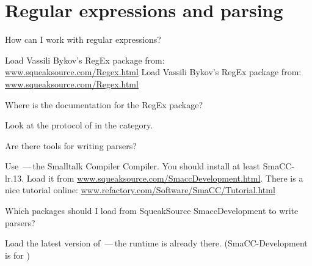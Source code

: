 \documentclass[a4paper,10pt,twoside]{book}
\begin{document}
\section{Regular expressions and parsing}

\begin{faq}
How can I work with regular expressions?
\end{faq}
\answer
\ifluluelse
	{Load Vassili Bykov's RegEx package from: \\
	\url{www.squeaksource.com/Regex.html}}
	{Load Vassili Bykov's RegEx package from:
	\url{www.squeaksource.com/Regex.html}}

\begin{faq}
Where is the documentation for the RegEx package?
\end{faq}
\answer
Look at the  protocol of  in the  category.

\begin{faq}
Are there tools for writing parsers?
\end{faq}
\answer
Use \,---\,the Smalltalk Compiler Compiler.
You should install at least SmaCC-lr.13.
Load it from \url{www.squeaksource.com/SmaccDevelopment.html}.
There is a nice tutorial online:
\url{www.refactory.com/Software/SmaCC/Tutorial.html}

\begin{faq}
Which packages should I load from SqueakSource SmaccDevelopment to write parsers?
\end{faq}
\answer
Load the latest version of \,---\,the runtime is already there.
(SmaCC-Development is for )

\ifx\wholebook\relax\else
\end{document}
